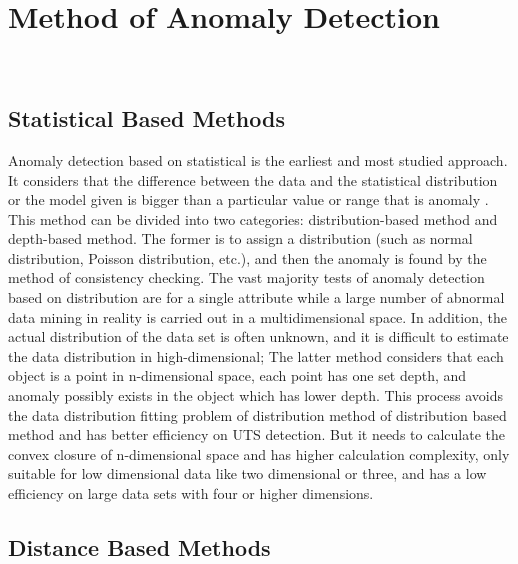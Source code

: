 \section{Method of Anomaly Detection}~\label{sec-method}

\subsection{Statistical Based Methods}

Anomaly detection based on statistical is the earliest and
most studied approach.
It considers that the difference
between the data and the statistical distribution or the model
given is bigger than a particular value or range that is
anomaly .
This method can be divided into two
categories: distribution-based method and depth-based
method.
The former is to assign a distribution (such as
normal distribution,
Poisson distribution,
etc.),
and then the anomaly is found by the method of consistency checking.
The vast majority tests of anomaly detection based on
distribution are for a single attribute while a large number
of abnormal data mining in reality is carried out in a
multidimensional space.
In addition,
the actual distribution
of the data set is often unknown,
and it is difficult to
estimate the data distribution in high-dimensional; The
latter method considers that each object is a point in
n-dimensional space,
each point has one set depth,
and anomaly possibly exists in the object which has lower depth.
This process avoids the data distribution fitting problem of
distribution method of distribution based method and has
better efficiency on UTS detection.
But it needs to calculate
the convex closure of n-dimensional space and has higher
calculation complexity,
only suitable for low dimensional
data like two dimensional or three,
and has a low efficiency
on large data sets with four or higher dimensions.

\subsection{Distance Based Methods}

